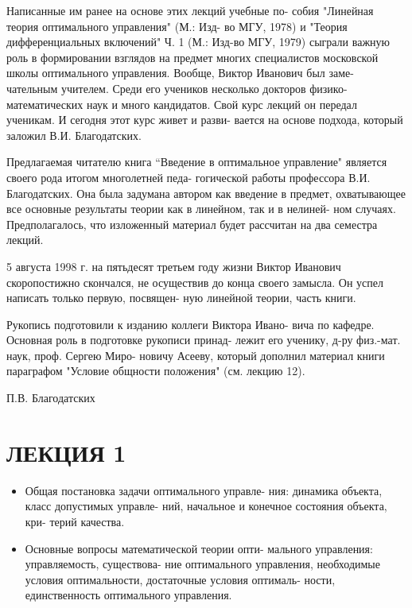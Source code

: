 \documentclass[8pt]{extarticle}
\begin{document}
Написанные им ранее на основе этих лекций учебные по- собия "Линейная теория оптимального управления" (М.: Изд- во МГУ, 1978) и "Теория дифференциальных включений" Ч. 1 (М.: Изд-во МГУ, 1979) сыграли важную роль в формировании взглядов на предмет многих специалистов московской школы оптимального управления. Вообще, Виктор Иванович был заме- чательным учителем. Среди его учеников несколько докторов физико-математических наук и много кандидатов. Свой курс лекций он передал ученикам. И сегодня этот курс живет и разви- вается на основе подхода, который заложил В.И. Благодатских.

Предлагаемая читателю книга “Введение в оптимальное управление" является своего рода итогом многолетней педа- гогической работы профессора В.И. Благодатских. Она была задумана автором как введение в предмет, охватывающее все основные результаты теории как в линейном, так и в нелиней- ном случаях. Предполагалось, что изложенный материал будет рассчитан на два семестра лекций.

5 августа 1998 г. на пятьдесят третьем году жизни Виктор Иванович скоропостижно скончался, не осуществив до конца своего замысла. Он успел написать только первую, посвящен- ную линейной теории, часть книги.

Рукопись подготовили к изданию коллеги Виктора Ивано- вича по кафедре. Основная роль в подготовке рукописи принад- лежит его ученику, д-ру физ.-мат. наук, проф. Сергею Миро- новичу Асееву, который дополнил материал книги параграфом "Условие общности положения" (см. лекцию 12).

П.В. Благодатских

\section*{ЛЕКЦИЯ 1}

\begin{itemize}\relax
\item\relax Общая постановка задачи оптимального управле- ния: динамика объекта, класс допустимых управле- ний, начальное и конечное состояния объекта, кри- терий качества.
\end{itemize}

\begin{itemize}\relax
\item\relax Основные вопросы математической теории опти- мального управления: управляемость, существова- ние оптимального управления, необходимые условия оптимальности, достаточные условия оптималь- ности, единственность оптимального управления.
\end{itemize}
\end{document}

